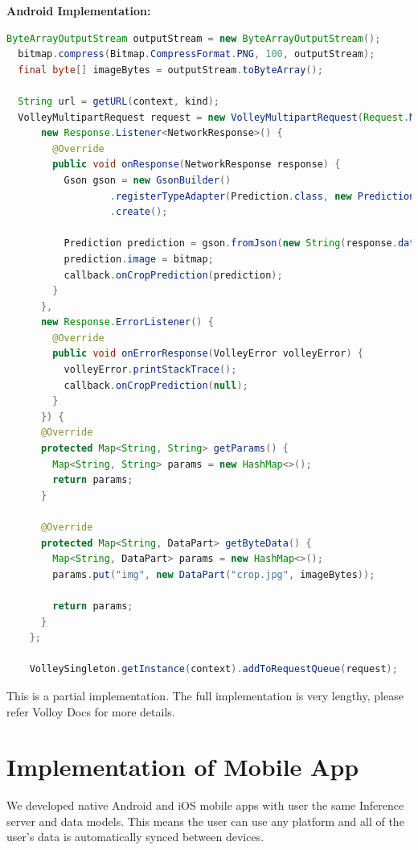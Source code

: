 \documentclass[../Report.tex]{subfiles}
\begin{document}
\noindent \textbf{Android Implementation:}
\begin{lstlisting}[language=java,caption={Android multipart/form-data request Implementation},captionpos=b]
  ByteArrayOutputStream outputStream = new ByteArrayOutputStream();
  bitmap.compress(Bitmap.CompressFormat.PNG, 100, outputStream);
  final byte[] imageBytes = outputStream.toByteArray();

  String url = getURL(context, kind);
  VolleyMultipartRequest request = new VolleyMultipartRequest(Request.Method.POST, url,
      new Response.Listener<NetworkResponse>() {
        @Override
        public void onResponse(NetworkResponse response) {
          Gson gson = new GsonBuilder()
                  .registerTypeAdapter(Prediction.class, new PredictionDeserializer())
                  .create();

          Prediction prediction = gson.fromJson(new String(response.data), Prediction.class);
          prediction.image = bitmap;
          callback.onCropPrediction(prediction);
        }
      },
      new Response.ErrorListener() {
        @Override
        public void onErrorResponse(VolleyError volleyError) {
          volleyError.printStackTrace();
          callback.onCropPrediction(null);
        }
      }) {
      @Override
      protected Map<String, String> getParams() {
        Map<String, String> params = new HashMap<>();
        return params;
      }

      @Override
      protected Map<String, DataPart> getByteData() {
        Map<String, DataPart> params = new HashMap<>();
        params.put("img", new DataPart("crop.jpg", imageBytes));

        return params;
      }
    };

    VolleySingleton.getInstance(context).addToRequestQueue(request);
\end{lstlisting}

This is a partial implementation. The full implementation is very lengthy, please refer Volloy Docs for more details.

\section{Implementation of Mobile App}

We developed native Android and iOS mobile apps with user the same Inference server and data models. This means the user can use any platform
and all of the user's data is automatically synced between devices.
\end{document}
